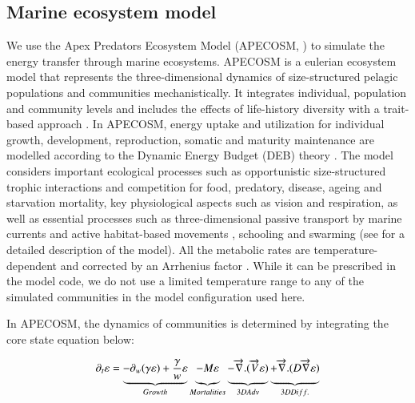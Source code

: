 \subsection{Marine ecosystem model}
\label{sec:apecosm}

We use the Apex Predators Ecosystem Model (APECOSM, \citealp{mauryModelingEnvironmentalEffects2007, mauryOverviewAPECOSMSpatialized2010}) to simulate the energy transfer through marine ecosystems. 
APECOSM is a eulerian ecosystem model that represents the three-dimensional dynamics of size-structured pelagic populations and communities mechanistically. It integrates individual, population and community levels and includes the effects of life-history diversity with a trait-based approach \citep{mauryIndividualsPopulationsCommunities2013}. In APECOSM, energy uptake and utilization for individual growth, development, reproduction, somatic and maturity maintenance are modelled according to the Dynamic Energy Budget (DEB) theory \citep{koojmanDynamicEnergyBudget2010}. The model considers important ecological processes such as opportunistic size-structured trophic interactions and competition for food, predatory, disease, ageing and starvation mortality, key physiological aspects such as vision and respiration, as well as essential processes such as three-dimensional passive transport by marine currents and active habitat-based movements \citep{faugerasAdvectiondiffusionreactionSizestructuredFish2005}, schooling and swarming (see \citealp{mauryModelingEnvironmentalEffects2007, mauryIndividualsPopulationsCommunities2013, mauryCanSchoolingRegulate2017} for a detailed description of the model). 
 All the metabolic rates are temperature-dependent and corrected by an Arrhenius factor \citep{mauryModelingEnvironmentalEffects2007, mauryIndividualsPopulationsCommunities2013}. While it can be prescribed in the model code, we do not use a limited temperature range to any of the simulated communities in the model configuration used here.

In APECOSM, the dynamics of communities is determined by integrating the core state equation below:

\begin{equation}
\partial_t \varepsilon = \underbrace{- \partial_w(\gamma \varepsilon) + \frac{\gamma}{w}\varepsilon}_{Growth} 
\underbrace{- M \varepsilon \vphantom{\frac{\gamma}{w}\varepsilon}}_{Mortalities}
\underbrace{-\overrightarrow{\nabla}.(\overrightarrow{V} \varepsilon) \vphantom{\frac{\gamma}{w}\varepsilon}}_{3D Adv} 
\underbrace{+ \overrightarrow{\nabla} . (D \overrightarrow{\nabla} \varepsilon) \vphantom{\frac{\gamma}{w}\varepsilon}}_{3D Diff.}
\label{eq:apecosm_trend}
\end{equation}

